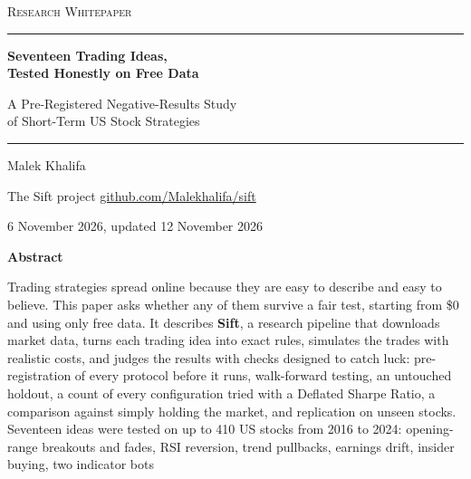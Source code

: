 \documentclass[11pt,a4paper]{article}
\begin{document}
\begin{titlepage}
\centering
\vspace*{1.5cm}
{\scshape\large Research Whitepaper\par}
\vspace{1.2cm}
{\color{accent}\rule{\linewidth}{1pt}}\par
\vspace{0.5cm}
{\huge\bfseries Seventeen Trading Ideas,\\[4pt] Tested Honestly on Free Data\par}
\vspace{0.4cm}
{\Large A Pre-Registered Negative-Results Study\\ of Short-Term US Stock Strategies\par}
\vspace{0.5cm}
{\color{accent}\rule{\linewidth}{1pt}}\par
\vspace{1.1cm}
{\Large Malek Khalifa\par}
\vspace{0.3cm}
{\large The Sift project \quad\textperiodcentered\quad \href{https://github.com/Malekhalifa/sift}{github.com/Malekhalifa/sift}\par}
\vspace{0.3cm}
{\large 6 November 2026, updated 12 November 2026\par}
\vspace{1.4cm}
\begin{minipage}{0.88\linewidth}
\begin{center}\bfseries Abstract\end{center}
\small
Trading strategies spread online because they are easy to describe and easy to believe. This paper asks whether any of
them survive a fair test, starting from \$0 and using only free data. It describes \textbf{Sift}, a research pipeline that
downloads market data, turns each trading idea into exact rules, simulates the trades with realistic costs, and judges the
results with checks designed to catch luck: pre-registration of every protocol before it runs, walk-forward testing,
an untouched holdout, a count of every configuration tried with a Deflated Sharpe Ratio, a comparison against simply
holding the market, and replication on unseen stocks. Seventeen ideas were tested on up to 410 US stocks from 2016 to 2024:
opening-range breakouts and fades, RSI reversion, trend pullbacks, earnings drift, insider buying, two indicator bots

\end{minipage}
\end{titlepage}
\end{document}
